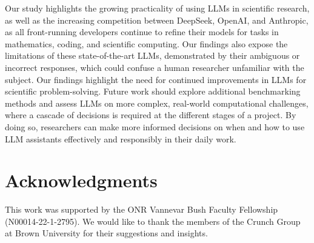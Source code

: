 \documentclass{article}
\begin{document}
Our study highlights the growing practicality of using LLMs in scientific research, as well as the increasing competition between DeepSeek, OpenAI, and Anthropic, as all front-running developers continue to refine their models for tasks in mathematics, coding, and scientific computing. Our findings also expose the limitations of these state-of-the-art LLMs, demonstrated by their ambiguous or incorrect responses, which could confuse a human researcher unfamiliar with the subject. Our findings highlight the need for continued improvements in LLMs for scientific problem-solving. Future work should explore additional benchmarking methods and assess LLMs on more complex, real-world computational challenges, where a cascade of decisions is required at the different stages of a project. By doing so, researchers can make more informed decisions on when and how to use LLM assistants effectively and responsibly in their daily work.

\section*{Acknowledgments}
This work was supported by the ONR Vannevar Bush Faculty Fellowship (N00014-22-1-2795). We would like to thank the members of the Crunch Group at Brown University for their suggestions and insights. 



  
  
\end{document}
